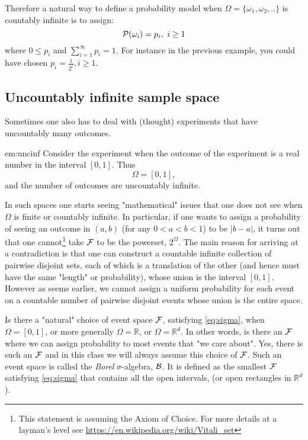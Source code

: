 Therefore a natural way to define a probability model when $\Omega=\{\omega_1, \omega_2,..\}$ is countably infinite is to assign:
$$ \mathcal{P}(\omega_i) = p_i, ~ i \geq 1$$
where $0 \leq p_i$ and $\sum_{i=1}^\infty p_i=1$. For instance in the previous example, you could have chosen $p_i = \frac{1}{2^i}, i \geq 1$.

\subsection{Uncountably infinite sample space}
Sometimes one also has to deal with (thought) experiments that have uncountably many outcomes.

\begin{exmp}{em:uncinf}
Consider the experiment when the outcome of the experiment is a real number in the interval $[0,1]$. Thus
$$ \Omega = [0,1],$$
and the number of outcomes are uncountably infinite.
\end{exmp}

\begin{remark} In such spaces one starts seeing "mathematical" issues that one does not see when $\Omega$ is finite or countably infinite. In particular, if one wants to assign a probability of seeing an outcome in $(a,b)$ (for any $0 < a < b < 1$) to be $|b-a|$, it turns out that one cannot\footnote{This statement is assuming the Axiom of Choice. For more details at a layman's level see \url{https://en.wikipedia.org/wiki/Vitali_set}} take $\mathcal{F}$ to be the powerset, $2^{\Omega}$. \adv The main reason for arriving at a contradiction is that one can construct a countable infinite collection of pairwise disjoint sets, each of which is a translation of the other (and hence must have the same "length" or probability), whose union is the interval $[0,1]$. However as seems earlier, we cannot assign a uniform probability for each event on a countable number of pairwise disjoint events whose union is the entire space.
\end{remark}

Is there a "natural" choice of event space $\mathcal{F}$, satisfying \ref{eq:sigma}, when $\Omega=[0,1]$, or more generally $\Omega=\mathbb{R}$, or $\Omega=\mathbb{R}^d$. In other words, is there an $\mathcal{F}$ where we can assign probability to most events that "we care about". Yes, there is such an $\mathcal{F}$ and in this class we will always assume this choice of $\mathcal{F}$. Such an event space is called the \textit{Borel} $\sigma$-algebra, $\mathcal{B}$. It is defined as the smallest $\mathcal{F}$ satisfying \ref{eq:sigma} that contains all the open intervals, (or open rectangles in $\mathbb{R}^d$).

